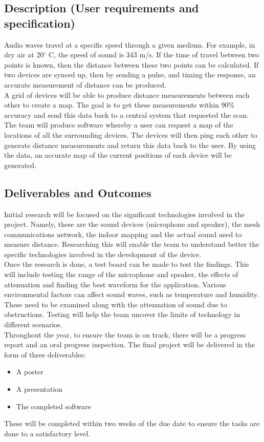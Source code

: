 \documentclass[9pt, a4paper]{report}
\begin{document}
	\subsection*{Description (User requirements and specification)}
	Audio waves travel at a specific speed through a given medium. For example, in dry air at 20$^{\circ}$ C, the speed of sound is 343 m/s. If the time of travel between two points is known, then the distance between these two points can be calculated. If two devices are synced up, then by sending a pulse, and timing the response, an accurate measurement of distance can be produced.\\
	
	A grid of devices will be able to produce distance measurements between each other to create a map. The goal is to get these measurements within 90\% accuracy and send this data back to a central system that requested the scan. The team will produce software whereby a user can request a map of the locations of all the surrounding devices. The devices will then ping each other to generate distance measurements and return this data back to the user. By using the data, an accurate map of the current positions of each device will be generated. \\
	
	\subsection*{Deliverables and Outcomes}
	Initial research will be focused on the significant technologies involved in the project. Namely, these are the sound devices (microphone and speaker), the mesh communications network, the indoor mapping and the actual sound used to measure distance. Researching this will enable the team to understand better the specific technologies involved in the development of the device.\\
	
	Once the research is done, a test board can be made to test the findings. This will include testing the range of the microphone and speaker, the effects of attenuation and finding the best waveform for the application. Various environmental factors can affect sound waves, such as temperature and humidity. These need to be examined along with the attenuation of sound due to obstructions. Testing will help the team uncover the limits of technology in different scenarios.\\
	
	Throughout the year, to ensure the team is on track, there will be a progress report and an oral progress inspection. The final project will be delivered in the form of three deliverables:
	\begin{itemize}
		\item A poster 
		\item A presentation 
		\item The completed software 
	\end{itemize}
	These will be completed within two weeks of the due date to ensure the tasks are done to a satisfactory level.
\end{document}
